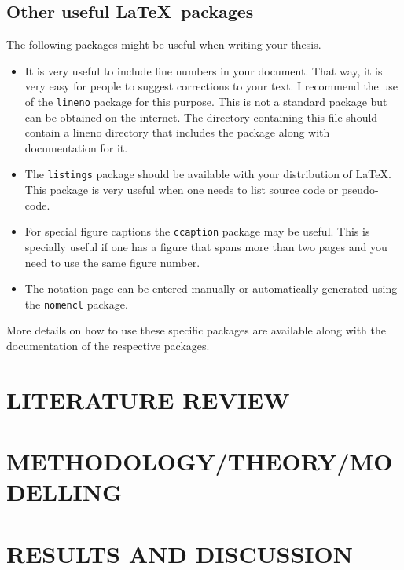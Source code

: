 \documentclass[BTech]{cetlyproj}
\begin{document}
\section{Other useful \LaTeX\ packages}

The following packages might be useful when writing your thesis.

\begin{itemize}  
\item It is very useful to include line numbers in your document.
  That way, it is very easy for people to suggest corrections to your
  text.  I recommend the use of the \texttt{lineno} package for this
  purpose.  This is not a standard package but can be obtained on the
  internet.  The directory containing this file should contain a
  lineno directory that includes the package along with documentation
  for it.

\item The \texttt{listings} package should be available with your
  distribution of \LaTeX.  This package is very useful when one needs
  to list source code or pseudo-code.

\item For special figure captions the \texttt{ccaption} package may be
  useful.  This is specially useful if one has a figure that spans
  more than two pages and you need to use the same figure number.

\item The notation page can be entered manually or automatically
  generated using the \texttt{nomencl} package.

\end{itemize}

More details on how to use these specific packages are available along
with the documentation of the respective packages.

\chapter{LITERATURE REVIEW}
\label{chap:literaturereview}

\chapter{METHODOLOGY/THEORY/MODELLING}
\label{chap:method}

\chapter{RESULTS AND DISCUSSION}
\label{chap:result}
\end{document}
